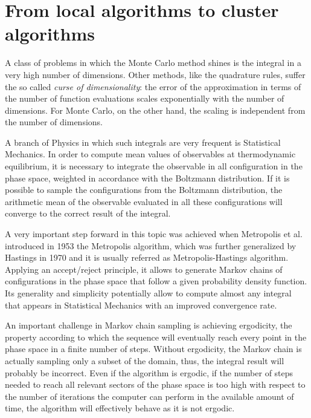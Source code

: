 \section*{From local algorithms to cluster algorithms}
A class of problems in which the Monte Carlo method shines is the integral in a very high number of dimensions.
Other methods, like the quadrature rules, suffer the so called \emph{curse of dimensionality}: the error of the approximation in terms of the number of function evaluations scales exponentially with the number of dimensions.
For Monte Carlo, on the other hand, the scaling is independent from the number of dimensions.

A branch of Physics in which such integrals are very frequent is Statistical Mechanics.
In order to compute mean values of observables at thermodynamic equilibrium,
it is necessary to integrate the observable in all configuration in the phase space, weighted in accordance with the Boltzmann distribution.
If it is possible to sample the configurations from the Boltzmann distribution,
the arithmetic mean of the observable evaluated in all these configurations will converge to the correct result of the integral.

A very important step forward in this topic was achieved when Metropolis et al. introduced in 1953 \cite{metropolis:1953} the Metropolis algorithm,
which was further generalized by Hastings in 1970 \cite{hastings:1970} and it is usually referred as Metropolis-Hastings algorithm.
Applying an accept/reject principle, it allows to generate Markov chains of configurations in the phase space that follow a given probability density function.
Its generality and simplicity potentially allow to compute almost any integral that appears in Statistical Mechanics with an improved convergence rate.

An important challenge in Markov chain sampling is achieving ergodicity,
\ie the property according to which the sequence will eventually reach every point in the phase space in a finite number of steps.
Without ergodicity, the Markov chain is actually sampling only a subset of the domain, thus, the integral result will probably be incorrect.
Even if the algorithm is ergodic, if the number of steps needed to reach all relevant sectors of the phase space is too high
with respect to the number of iterations the computer can perform in the available amount of time, the algorithm will effectively behave as it is not ergodic.

